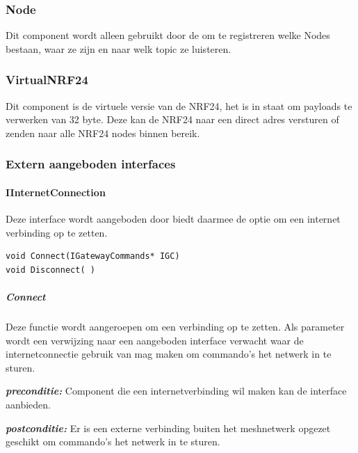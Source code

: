 \documentclass[a4paper, 11pt, oneside]{report}
\begin{document}
\subsubsection{Node}
\label{architectural:subcomponenten:Node}
Dit component wordt alleen gebruikt door de  om te registreren welke Nodes bestaan, waar ze zijn en naar welk topic ze luisteren.
\subsubsection{VirtualNRF24}
\label{architectural:subcomponenten:VirtualNRF24}
Dit component is de virtuele versie van de NRF24, het is in staat om payloads te verwerken van 32 byte.
Deze kan de NRF24 naar een direct adres versturen of zenden naar alle NRF24 nodes binnen bereik.

\subsubsection{Extern aangeboden interfaces}
\label{DetailedDesign:ros:extern:interfaces}

\paragraph{IInternetConnection}
\label{DetailedDesign:ros:extern:interfaces:IInternetConnection}
Deze interface wordt aangeboden door  biedt daarmee de optie om een internet verbinding op te zetten. 
 
\begin{lstlisting}
void Connect(IGatewayCommands* IGC) 
void Disconnect( )
\end{lstlisting}

\subparagraph{Connect} 
\label{DetailedDesign:ros:extern:interfaces:IInternetConnection:Connect}
Deze functie wordt aangeroepen om een verbinding op te zetten.
Als parameter wordt een verwijzing naar een aangeboden interface verwacht waar de internetconnectie gebruik van mag maken om commando's het netwerk in te sturen. 

\textbf{\textit{preconditie:}} Component die een internetverbinding wil maken kan de interface  aanbieden.

\textbf{\textit{postconditie:}} Er is een externe verbinding buiten het meshnetwerk opgezet geschikt om commando's het netwerk in te sturen.
\end{document}
